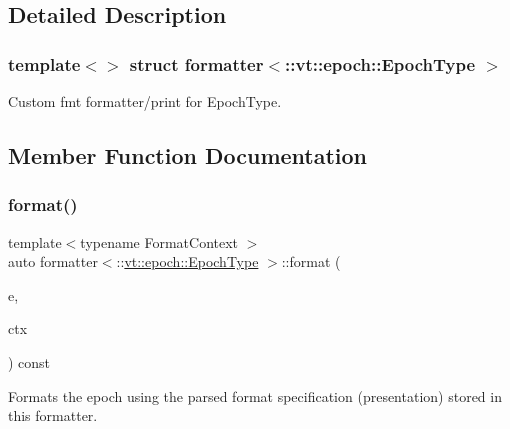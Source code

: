 \subsection{Detailed Description}
\subsubsection*{template$<$$>$\newline
struct formatter$<$\+::vt\+::epoch\+::\+Epoch\+Type $>$}

Custom fmt formatter/print for {\ttfamily Epoch\+Type}. 

\subsection{Member Function Documentation}
\mbox{\label{structformatter_3_1_1vt_1_1epoch_1_1_epoch_type_01_4_a3cb576a964fb01c01250ae6d3f4c5034}} 
\subsubsection{\texorpdfstring{format()}{format()}}
{\footnotesize\ttfamily template$<$typename Format\+Context $>$ \\
auto formatter$<$\+::\hyperlink{structvt_1_1epoch_1_1_epoch_type}{vt\+::epoch\+::\+Epoch\+Type} $>$\+::format (\begin{DoxyParamCaption}\item[{\+::\hyperlink{structvt_1_1epoch_1_1_epoch_type}{vt\+::epoch\+::\+Epoch\+Type} const \&}]{e,  }\item[{Format\+Context \&}]{ctx }\end{DoxyParamCaption}) const\hspace{0.3cm}{\ttfamily [inline]}}

Formats the epoch using the parsed format specification (presentation) stored in this formatter. \mbox{\label{structformatter_3_1_1vt_1_1epoch_1_1_epoch_type_01_4_aa731ea05b5a847af0606767b933063f0}} 
